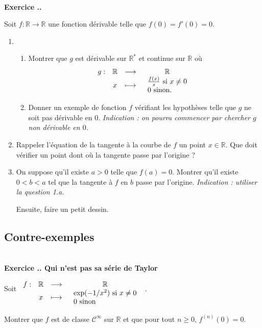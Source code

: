 \documentclass{article}
\newcommand{\fonction}[5]{\raisebox{-0.5\baselineskip}{$\begin{array}{lccc}
    #1: & #2 & \longrightarrow & #3 \\
        & #4 & \longmapsto & #5 \end{array}$}}
\newcommand{\mb}[1]{\mathbb{#1}}
\newcommand{\mc}[1]{\mathcal{#1}}
\newcounter{exo}
\newcommand{\exercice}[1][\null]{\textbf{\\ Exercice \thesection.\theexo. #1} \addtocounter{exo}{1}}
\begin{document}
\exercice

Soit $f : \mb{R} \rightarrow \mb{R}$ une fonction dérivable telle que $f(0) = f'(0) = 0$.

\begin{enumerate}

\item \begin{enumerate}\item Montrer que $g$ est dérivable sur $\mb{R}^*$ et continue sur $\mb{R}$ où 
$$\fonction{g}{\mb{R}}{\mb{R}}{x}{\begin{tabular}{ll} $\frac{f(x)}{x}$ si $x \neq 0$ \\ $0$ sinon.\end{tabular}}$$

\item Donner un exemple de fonction $f$ vérifiant les hypothèses telle que $g$ ne soit pas dérivable en $0$. \emph{Indication : on pourra commencer par chercher $g$ non dérivable en $0$.}

\end{enumerate}

\item Rappeler l'équation de la tangente à la courbe de $f$ un point $x \in \mb{R}$. Que doit vérifier un point dont où la tangente passe par l'origine ?

\item On suppose qu'il existe $a>0$ telle que $f(a) = 0$. Montrer qu'il existe $0 < b < a$ tel que la tangente à $f$ en $b$ passe par l'origine. \emph{Indication : utiliser la question 1.a.}

Ensuite, faire un petit dessin.

\end{enumerate}



\subsection{Contre-exemples}




\exercice[Qui n'est pas sa série de Taylor]

Soit $\fonction{f}{\mb{R}}{\mb{R}}{x}{\begin{tabular}{ll} $\exp(-1/x^2)$ si $x \neq 0$ \\ $0$ sinon\end{tabular}}$.

Montrer que $f$ est de classe $\mc{C}^\infty$ sur $\mb{R}$ et que pour tout $n \ge 0$, $f^{(n)}(0) = 0$.
\end{document}
